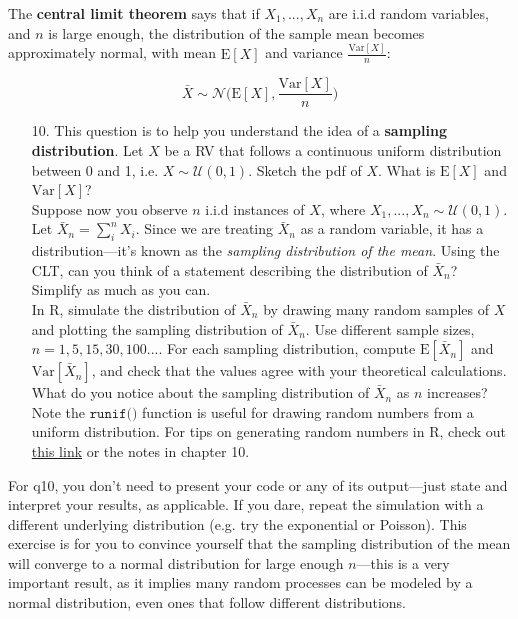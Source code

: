 \documentclass[10pt]{extarticle}
\newcommand{\E}{\text{E}}
\newcommand{\Var}{\text{Var}}
\begin{document}
\hfill 

The {\bf central limit theorem} says that if $X_1, ..., X_n$ are i.i.d random variables, and $n$ is large enough, the distribution of the sample mean becomes approximately normal, with mean $\E[X]$ and variance $\frac{\Var[X]}{n}$:

$$\bar X \sim \mathcal N \bigg( \E[X], \frac{\Var[X]}{n} \bigg)$$ 

\hfill 

\begin{itemize}

	\item[10.] This question is to help you understand the idea of a {\bf sampling distribution}. Let $X$ be a RV that follows a continuous uniform distribution between 0 and 1, i.e. $X \sim \mathcal U(0,1)$. Sketch the pdf of $X$. What is $\E[X]$ and $\Var[X]$? \\ 

Suppose now you observe $n$ i.i.d instances of $X$, where $X_1, ..., X_n \sim \mathcal U(0,1)$. Let $\bar X_n = \sum_i^n X_i$. Since we are treating $\bar X_n$ as a random variable, it has a distribution---it's known as the {\it sampling distribution of the mean}. Using the CLT, can you think of a statement describing the distribution of $\bar X_n$? Simplify as much as you can. \\ 

In R, simulate the distribution of $\bar X_n$ by drawing many random samples of $X$ and plotting the sampling distribution of $\bar X_n$. Use different sample sizes, $n = 1, 5, 15, 30, 100...$. For each sampling distribution, compute $\E[\bar X_n]$ and $\Var[\bar X_n]$, and check that the values agree with your theoretical calculations. What do you notice about the sampling distribution of $\bar X_n$ as $n$ increases? Note the $\texttt{runif()}$ function is useful for drawing random numbers from a uniform distribution. For tips on generating random numbers in R, check out \href{https://bookdown.org/ndphillips/YaRrr/generating-random-data.html}{this link} or the notes in chapter 10.  

\end{itemize}

\hfill 

For q10, you don't need to present your code or any of its output---just state and interpret your results, as applicable. If you dare, repeat the simulation with a different underlying distribution (e.g. try the exponential or Poisson). This exercise is for you to convince yourself that the sampling distribution of the mean will converge to a normal distribution for large enough $n$---this is a very important result, as it implies many random processes can be modeled by a normal distribution, even ones that follow different distributions.  
\end{document}

